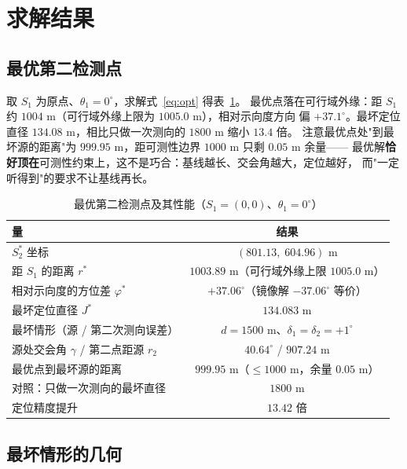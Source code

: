 \section{求解结果}\label{sec:res}

\subsection{最优第二检测点}

取 $S_1$ 为原点、$\theta_1=0^\circ$，求解式~\eqref{eq:opt} 得表~\ref{tab:best}。
最优点落在可行域外缘：距 $S_1$ 约 $1004$ m（可行域外缘上限为 $1005.0$ m），相对示向度方向
偏 $+37.1^\circ$。最坏定位直径 $134.08$ m，相比只做一次测向的 $1800$ m 缩小 $13.4$ 倍。
注意最优点处"到最坏源的距离"为 $999.95$ m，距可测性边界 $1000$ m 只剩 $0.05$ m 余量——
最优解\textbf{恰好顶在}可测性约束上，这不是巧合：基线越长、交会角越大，定位越好，
而"一定听得到"的要求不让基线再长。

\begin{table}[H]
  \centering
  \caption{最优第二检测点及其性能（$S_1=(0,0)$、$\theta_1=0^\circ$）}
  \label{tab:best}
  \begin{tabular}{lc}
    \toprule
    \textbf{量} & \textbf{结果} \\
    \midrule
    $S_2^*$ 坐标                                   & $(801.13,\;604.96)$ m \\
    距 $S_1$ 的距离 $r^*$                          & $1003.89$ m（可行域外缘上限 $1005.0$ m） \\
    相对示向度的方位差 $\varphi^*$                 & $+37.06^\circ$（镜像解 $-37.06^\circ$ 等价） \\
    最坏定位直径 $J^*$                             & $\mathbf{134.083}$ m \\
    最坏情形（源 / 第二次测向误差）                & $d=1500$ m、$\delta_1=\delta_2=+1^\circ$ \\
    源处交会角 $\gamma$ / 第二点距源 $r_2$         & $40.64^\circ$ / $907.24$ m \\
    最优点到最坏源的距离                           & $999.95$ m（$\le1000$ m，余量 $0.05$ m） \\
    对照：只做一次测向的最坏直径                   & $1800$ m \\
    定位精度提升                                   & $\mathbf{13.42}$ 倍 \\
    \bottomrule
  \end{tabular}
\end{table}

\subsection{最坏情形的几何}

